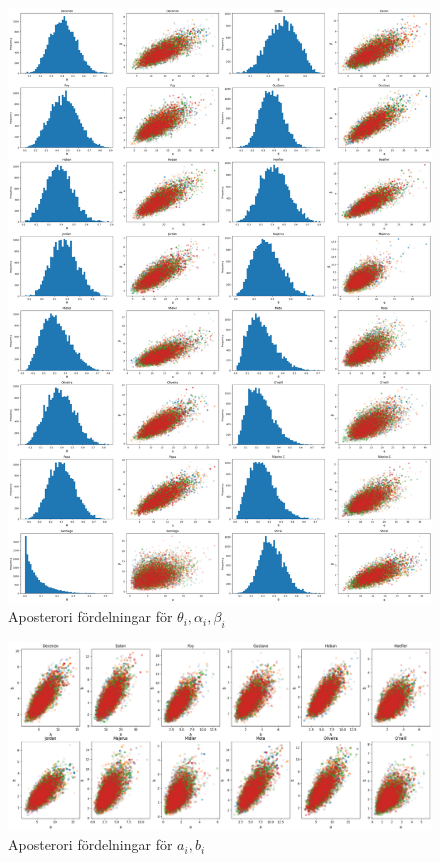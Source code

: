 \documentclass{article}
\begin{document}
\begin{figure}[htbp]
    \centering
    \includegraphics[width=1\textwidth]{Figures/3b.png}
    \caption{Aposterori fördelningar för $\theta_i, \alpha_i, \beta_i$}
    \label{fig:3b}
\end{figure}


\begin{figure}[t]
    \centering
    \includegraphics[width=1\textwidth]{Figures/3c.png}
    \caption{Aposterori fördelningar för $a_i, b_i$}
    \label{fig:3c}
\end{figure}
\end{document}
